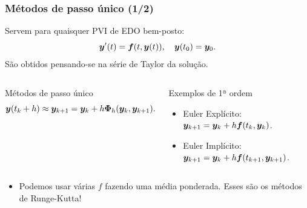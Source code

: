 \begin{frame}
\justifying
\frametitle{Métodos de passo único (1/2)}
    Servem para quaisquer PVI de EDO bem-posto:
    $$
    \bm y'(t) = \bm f(t, \bm y(t)), \quad \bm y(t_0) = \bm y_0.
    $$
    São obtidos pensando-se na série de Taylor da solução.

    \begin{columns}[c]
        \justifying
            \begin{block}{Métodos de passo único}
                $$
                \bm y(t_k + h) \approx \bm y_{k+1} = \bm y_k + h \bm \Phi_h(\bm y_k, \bm y_{k+1}).
                $$
            \end{block}
            \pause
            \begin{exampleblock}{Exemplos de 1ª ordem}
                \begin{itemize}
                    \item Euler Explícito: $\bm y_{k+1} = \bm y_k + h \bm f(t_k, \bm y_k)$.
                    \item Euler Implícito: $\bm y_{k+1} = \bm y_k + h \bm f(t_{k+1}, \bm y_{k+1})$.
                \end{itemize}
            \end{exampleblock}
        
        \justifying
    \end{columns}
    \vspace{0.5cm}
    \pause
    \begin{itemize}
        \item Podemos usar várias $f$ fazendo uma média ponderada. Esses são os métodos de Runge-Kutta!
    \end{itemize}
\end{frame}

